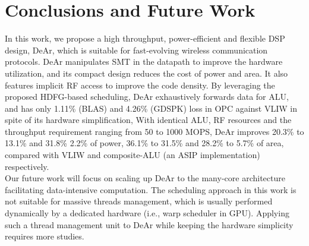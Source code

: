 \section{Conclusions and Future Work}
In this work, we propose a high throughput, power-efficient and flexible DSP design, DeAr,
which is suitable for fast-evolving wireless communication protocols.
DeAr manipulates SMT in the datapath to improve the hardware utilization, 
and its compact design reduces the cost of power and area.
It also features implicit RF access to improve the code density.
By leveraging the proposed HDFG-based scheduling, 
DeAr exhaustively forwards data for ALU, 
and has only 1.11\% (BLAS) and 4.26\% (GDSPK) loss in OPC against VLIW in spite of its hardware simplification,
With identical ALU, RF resources and the throughput requirement ranging from 50 to 1000 MOPS, DeAr improves 20.3\% to 13.1\% and 31.8\% 2.2\% of power, 36.1\% to 31.5\% and 28.2\% to 5.7\% of area, compared with VLIW and composite-ALU (an ASIP implementation) respectively.
\\\indent
Our future work will focus on scaling up DeAr to the many-core architecture facilitating data-intensive computation.
The scheduling approach in this work is not suitable for massive threads management, 
which is usually performed dynamically by a dedicated hardware (i.e., warp scheduler in GPU).
Applying such a thread management unit to DeAr while keeping the hardware simplicity requires more studies.



